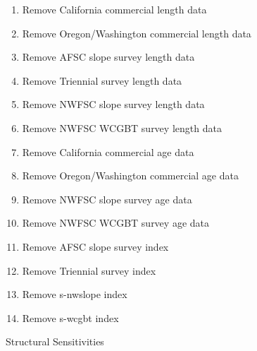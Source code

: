 \documentclass[11pt,
  english,
  a4paper,
]{article}
\begin{document}
\begin{enumerate}
   
  \item Remove California commercial length data
  
  \item Remove Oregon/Washington commercial length data
  
  \item Remove AFSC slope survey length data
  
  \item Remove Triennial survey length data
  
  \item Remove NWFSC slope survey length data
  
  \item Remove NWFSC WCGBT survey length data
  
  \item Remove California commercial age data
  
  \item Remove Oregon/Washington commercial age data
  
  \item Remove NWFSC slope survey age data
  
  \item Remove NWFSC WCGBT survey age data
  
  \item Remove AFSC slope survey index
  
  \item Remove Triennial survey index
  
  \item Remove \gls{s-nwslope} index
  
  \item Remove \gls{s-wcgbt} index
  
\end{enumerate}


Structural Sensitivities

\leavevmode\tagmcend\tagstructend\par
\end{document}
